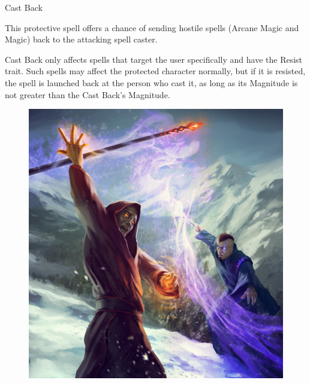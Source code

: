 \begin{rpg-spell}
{Cast Back}
{}

This protective spell offers a chance of sending hostile spells (Arcane Magic and Magic) back to the attacking spell caster. 

Cast Back only affects spells that target the user specifically and have the Resist trait. Such spells may affect the protected character normally, but if it is resisted, the spell is launched back at the person who cast it, as long as its Magnitude is not greater than the Cast Back’s Magnitude. 
\end{rpg-spell}

\begin{figure}[h]
\begin{center}
\includegraphics[scale=0.41]{img/sever_the_source_card_by_sirend.jpg}
\end{center}
\end{figure}


